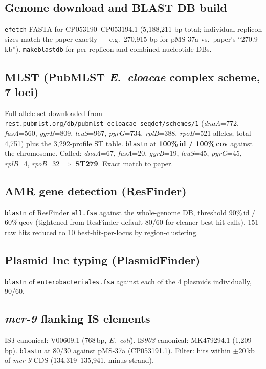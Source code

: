 \documentclass[11pt,letterpaper]{article}
\begin{document}
\subsection{Genome download and BLAST DB build}
\texttt{efetch} FASTA for CP053190--CP053194.1 (5,188,211 bp total; individual replicon sizes match the paper exactly --- e.g.\ 270,915 bp for pMS-37a vs.\ paper's ``270.9\,kb''). \texttt{makeblastdb} for per-replicon and combined nucleotide DBs.

\subsection{MLST (PubMLST \textit{E.\ cloacae} complex scheme, 7 loci)}
Full allele set downloaded from \texttt{rest.pubmlst.org/db/pubmlst\_ecloacae\_seqdef/schemes/1} (\textit{dnaA}=772, \textit{fusA}=560, \textit{gyrB}=809, \textit{leuS}=967, \textit{pyrG}=734, \textit{rplB}=388, \textit{rpoB}=521 alleles; total 4{,}751) plus the 3{,}292-profile ST table. \texttt{blastn} at \textbf{100\%\,id / 100\%\,cov} against the chromosome. Called: \textit{dnaA}=67, \textit{fusA}=20, \textit{gyrB}=19, \textit{leuS}=45, \textit{pyrG}=45, \textit{rplB}=4, \textit{rpoB}=32 $\Rightarrow$ \textbf{ST279}. Exact match to paper.

\subsection{AMR gene detection (ResFinder)}
\texttt{blastn} of ResFinder \texttt{all.fsa} against the whole-genome DB, threshold 90\%\,id / 60\%\,qcov (tightened from ResFinder default 80/60 for cleaner best-hit calls). 151 raw hits reduced to 10 best-hit-per-locus by region-clustering.

\subsection{Plasmid Inc typing (PlasmidFinder)}
\texttt{blastn} of \texttt{enterobacteriales.fsa} against each of the 4 plasmids individually, 90/60.

\subsection{\textit{mcr-9} flanking IS elements}
IS\textit{1} canonical: V00609.1 (768\,bp, \textit{E.\ coli}). IS\textit{903} canonical: MK479294.1 (1,209\,bp). \texttt{blastn} at 80/30 against pMS-37a (CP053191.1). Filter: hits within $\pm$20\,kb of \textit{mcr-9} CDS (134{,}319--135{,}941, minus strand).
\end{document}
